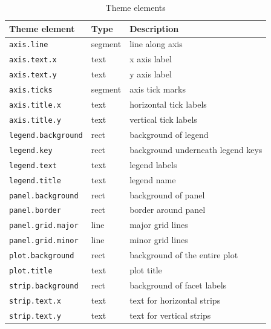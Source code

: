 \begin{table}
  \begin{center}
  \begin{tabular}{lll}\\
    \toprule
    Theme element              & Type     & Description  \\
    \midrule                              
    \texttt{axis.line}         & segment  & line along axis  \\
    \texttt{axis.text.x}       & text     & x axis label  \\
    \texttt{axis.text.y}       & text     & y axis label  \\
    \texttt{axis.ticks}        & segment  & axis tick marks  \\
    \texttt{axis.title.x}      & text     & horizontal tick labels  \\
    \texttt{axis.title.y}      & text     & vertical tick labels  \\[0.5em]

    \texttt{legend.background} & rect     & background of legend  \\
    \texttt{legend.key}        & rect     & background underneath legend keys \\
    \texttt{legend.text}       & text     & legend labels  \\
    \texttt{legend.title}      & text     & legend name  \\[0.5em]

    \texttt{panel.background}  & rect     & background of panel  \\
    \texttt{panel.border}      & rect     & border around panel  \\
    \texttt{panel.grid.major}  & line     & major grid lines \\
    \texttt{panel.grid.minor}  & line     & minor grid lines \\
    \texttt{plot.background}   & rect     & background of the entire plot \\
    \texttt{plot.title}        & text     & plot title   \\[0.5em]

    \texttt{strip.background}  & rect     & background of facet labels   \\
    \texttt{strip.text.x}      & text     & text for horizontal strips  \\
    \texttt{strip.text.y}      & text     & text for vertical strips  \\
    \bottomrule                           
  
  \end{tabular}
  \end{center}
  \caption{Theme elements}
  \label{tbl:elements}
\end{table}


